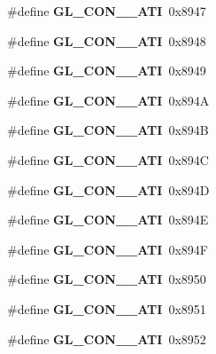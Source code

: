 \begin{DoxyCompactItemize}
\item 
\#define {\bfseries G\+L\+\_\+\+C\+O\+N\+\_\+\_\+\+A\+T\+I}~0x8947\label{_s_d_l__opengl_8h_ad0d9b75e4af2e6c5969899458b6d6463}

\item 
\#define {\bfseries G\+L\+\_\+\+C\+O\+N\+\_\+\_\+\+A\+T\+I}~0x8948\label{_s_d_l__opengl_8h_a15e7c6c9ff3bf1ef82c635f84fa0a9b7}

\item 
\#define {\bfseries G\+L\+\_\+\+C\+O\+N\+\_\+\_\+\+A\+T\+I}~0x8949\label{_s_d_l__opengl_8h_a2dd91c2de470450d355158f8f5e4afa3}

\item 
\#define {\bfseries G\+L\+\_\+\+C\+O\+N\+\_\+\_\+\+A\+T\+I}~0x894\+A\label{_s_d_l__opengl_8h_ac9b540292764f9cd11a78db57db153ca}

\item 
\#define {\bfseries G\+L\+\_\+\+C\+O\+N\+\_\+\_\+\+A\+T\+I}~0x894\+B\label{_s_d_l__opengl_8h_af944606909c6f17017711c86b6e5f89b}

\item 
\#define {\bfseries G\+L\+\_\+\+C\+O\+N\+\_\+\_\+\+A\+T\+I}~0x894\+C\label{_s_d_l__opengl_8h_afaf0e358d6316676266a86b0475e7290}

\item 
\#define {\bfseries G\+L\+\_\+\+C\+O\+N\+\_\+\_\+\+A\+T\+I}~0x894\+D\label{_s_d_l__opengl_8h_a87fca123944a42b5865c336e3517c4eb}

\item 
\#define {\bfseries G\+L\+\_\+\+C\+O\+N\+\_\+\_\+\+A\+T\+I}~0x894\+E\label{_s_d_l__opengl_8h_a5ff44f04e1f6c8eb6581f0d657d53d96}

\item 
\#define {\bfseries G\+L\+\_\+\+C\+O\+N\+\_\+\_\+\+A\+T\+I}~0x894\+F\label{_s_d_l__opengl_8h_ad126ae03ea8912040985f8882e487e79}

\item 
\#define {\bfseries G\+L\+\_\+\+C\+O\+N\+\_\+\_\+\+A\+T\+I}~0x8950\label{_s_d_l__opengl_8h_a7a6a21b915466182ac78f92e5fa2f959}

\item 
\#define {\bfseries G\+L\+\_\+\+C\+O\+N\+\_\+\_\+\+A\+T\+I}~0x8951\label{_s_d_l__opengl_8h_a3a6308817288289faa49fd1947a3ba2c}

\item 
\#define {\bfseries G\+L\+\_\+\+C\+O\+N\+\_\+\_\+\+A\+T\+I}~0x8952\label{_s_d_l__opengl_8h_ac2e961ee4aefba133e423435e03f6f30}


\end{DoxyCompactItemize}
